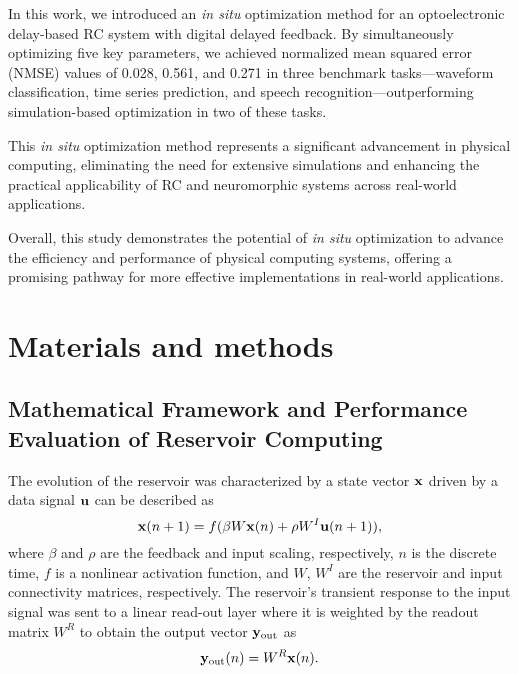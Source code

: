 \documentclass{WileyMSP-template}
\begin{document}
In this work, we introduced an \emph{in situ} optimization method for an optoelectronic delay-based RC system with digital delayed feedback. By simultaneously optimizing five key parameters, we achieved normalized mean squared error (NMSE) values of 0.028, 0.561, and 0.271 in three benchmark tasks—waveform classification, time series prediction, and speech recognition—outperforming simulation-based optimization in two of these tasks. 

This \emph{in situ} optimization method represents a significant advancement in physical computing, eliminating the need for extensive simulations and enhancing the practical applicability of RC and neuromorphic systems across real-world applications.

Overall, this study demonstrates the potential of \emph{in situ} optimization to advance the efficiency and performance of physical computing systems, offering a promising pathway for more effective implementations in real-world applications.

\section{Materials and methods}
\subsection{Mathematical Framework and Performance Evaluation of Reservoir Computing}
The evolution of the reservoir was characterized by a state vector $\vb{x}$ driven by a data signal $\vb{u}$ can be described as~\cite{ref:lukosevicius2009,ref:appeltant2011}
\begin{equation}
  \vb{x}(n+1)=f(\beta W\vb{x}(n)+\rho W^{I}\vb{u}(n+1)),
  \label{eq:rc-evolution}
\end{equation}
where $\beta$ and $\rho$ are the feedback and input scaling, respectively, $n$ is the discrete time, $f$ is a nonlinear activation function, and $W$, $W^I$ are the reservoir and input connectivity matrices, respectively.
The reservoir's transient response to the input signal was sent to a linear read-out layer where it is weighted by the readout matrix $W^R$ to obtain the output vector $\vb{y}_\mathrm{out}$ as
\begin{equation}
  \vb{y}_\mathrm{out}(n)=W^R\vb{x}(n).
  \label{eq:readout}
\end{equation}
\end{document}
